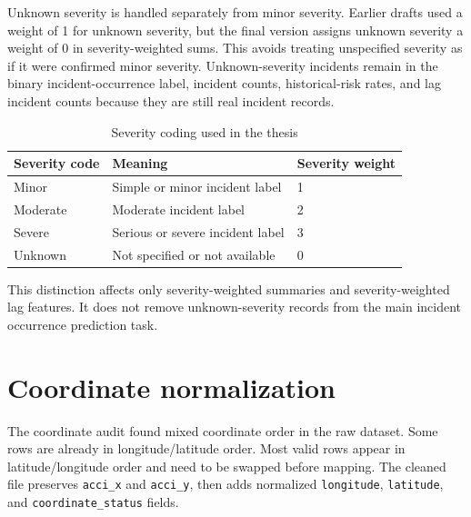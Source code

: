 Unknown severity is handled separately from minor severity. Earlier drafts used a weight of 1 for unknown severity, but the final version assigns unknown severity a weight of 0 in severity-weighted sums. This avoids treating unspecified severity as if it were confirmed minor severity. Unknown-severity incidents remain in the binary incident-occurrence label, incident counts, historical-risk rates, and lag incident counts because they are still real incident records.

\begin{table}[H]
\centering
\caption{Severity coding used in the thesis}
\label{tab:severity_coding}
\small
\begin{tabular}{lll}
\toprule
\textbf{Severity code} & \textbf{Meaning} & \textbf{Severity weight} \\
\midrule
Minor & Simple or minor incident label & 1 \\
Moderate & Moderate incident label & 2 \\
Severe & Serious or severe incident label & 3 \\
Unknown & Not specified or not available & 0 \\
\bottomrule
\end{tabular}
\end{table}

This distinction affects only severity-weighted summaries and severity-weighted lag features. It does not remove unknown-severity records from the main incident occurrence prediction task.

\section{Coordinate normalization}

The coordinate audit found mixed coordinate order in the raw dataset. Some rows are already in longitude/latitude order. Most valid rows appear in latitude/longitude order and need to be swapped before mapping. The cleaned file preserves \texttt{acci\_x} and \texttt{acci\_y}, then adds normalized \texttt{longitude}, \texttt{latitude}, and \texttt{coordinate\_status} fields.

